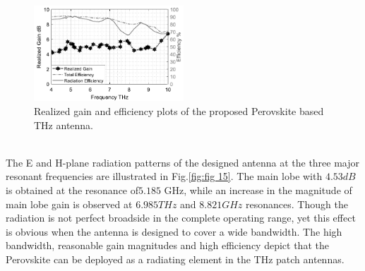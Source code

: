 \documentclass[12pt]{suhbook}
\begin{document}
\begin{figure}[hbt!]
\centering
\includegraphics[width=0.5\textwidth]{19}
\caption{Realized gain and efficiency plots of the proposed Perovskite based THz antenna.}
\label{Fig 119}
\end{figure}
\\The E and H-plane radiation patterns of the designed antenna at the three major resonant frequencies are illustrated in Fig.\ref{fig:fig 15}. The main lobe with $4.53 dB$ is obtained at the resonance of$ 5.185$ GHz, while an increase in the magnitude of main lobe gain is observed at $6.985 THz$ and $8.821 GHz$ resonances. Though the radiation is not perfect broadside in the complete operating range, yet this effect is obvious when the antenna is designed to cover a wide bandwidth. The high bandwidth, reasonable gain magnitudes and high efficiency depict that the Perovskite can be deployed as a radiating element in the THz patch antennas.\\
\end{document}
